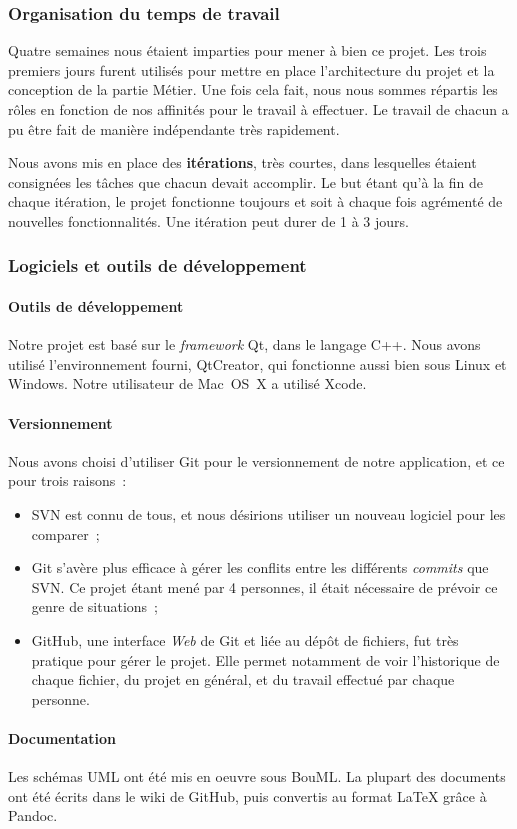 \subsubsection{Organisation du temps de travail}

Quatre semaines nous étaient imparties pour mener à bien ce projet.
Les trois premiers jours furent utilisés pour mettre en place
l'architecture du projet et la conception de la partie Métier. Une
fois cela fait, nous nous sommes répartis les rôles en fonction de
nos affinités pour le travail à effectuer. Le travail de chacun a
pu être fait de manière indépendante très rapidement.

Nous avons mis en place des \textbf{itérations}, très courtes, dans
lesquelles étaient consignées les tâches que chacun devait
accomplir. Le but étant qu'à la fin de chaque itération, le projet
fonctionne toujours et soit à chaque fois agrémenté de nouvelles
fonctionnalités. Une itération peut durer de 1 à 3 jours.

\subsubsection{Logiciels et outils de développement}

\paragraph{Outils de développement}

Notre projet est basé sur le \emph{framework} Qt, dans le langage
C++. Nous avons utilisé l'environnement fourni, QtCreator, qui
fonctionne aussi bien sous Linux et Windows. Notre utilisateur de
Mac~OS~X a utilisé Xcode.

\paragraph{Versionnement}

Nous avons choisi d'utiliser Git pour le versionnement de notre
application, et ce pour trois raisons~:

\begin{itemize}
\item
  SVN est connu de tous, et nous désirions utiliser un nouveau
  logiciel pour les comparer~;
\item
  Git s'avère plus efficace à gérer les conflits entre les différents
  \emph{commits} que SVN. Ce projet étant mené par 4 personnes, il
  était nécessaire de prévoir ce genre de situations~;
\item
  GitHub, une interface \emph{Web} de Git et liée au dépôt de
  fichiers, fut très pratique pour gérer le projet. Elle permet
  notamment de voir l'historique de chaque fichier, du projet en
  général, et du travail effectué par chaque personne.
\end{itemize}

\paragraph{Documentation}

Les schémas UML ont été mis en oeuvre sous BouML. La plupart des
documents ont été écrits dans le wiki de GitHub, puis convertis au
format LaTeX grâce à Pandoc.

